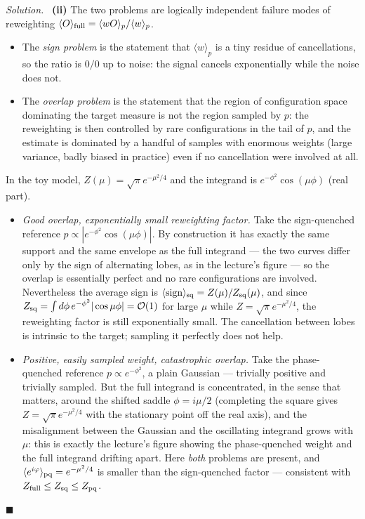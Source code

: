 \documentclass[11pt]{article}
\newenvironment{solution}{\par\smallskip\noindent\textit{Solution.}\ }{\hfill$\blacksquare$\par\smallskip}
\begin{document}
\begin{solution}
\textbf{(ii)} The two problems are logically independent failure modes of reweighting $\langle O\rangle_{\rm full} = \langle wO\rangle_p/\langle w\rangle_p$.
\begin{itemize}
  \item The \emph{sign problem} is the statement that $\langle w\rangle_p$ is a tiny residue of cancellations, so the ratio is $0/0$ up to noise: the signal cancels exponentially while the noise does not.
  \item The \emph{overlap problem} is the statement that the region of configuration space dominating the target measure is not the region sampled by $p$: the reweighting is then controlled by rare configurations in the tail of $p$, and the estimate is dominated by a handful of samples with enormous weights (large variance, badly biased in practice) even if no cancellation were involved at all.
\end{itemize}
In the toy model, $Z(\mu) = \sqrt\pi e^{-\mu^2/4}$ and the integrand is $e^{-\phi^2}\cos(\mu\phi)$ (real part).
\begin{itemize}
  \item[(a)] \emph{Good overlap, exponentially small reweighting factor.} Take the sign-quenched reference $p \propto |e^{-\phi^2}\cos(\mu\phi)|$. By construction it has exactly the same support and the same envelope as the full integrand --- the two curves differ only by the sign of alternating lobes, as in the lecture's figure --- so the overlap is essentially perfect and no rare configurations are involved. Nevertheless the average sign is $\langle \mathrm{sign}\rangle_{\rm sq} = Z(\mu)/Z_{\rm sq}(\mu)$, and since $Z_{\rm sq} = \int d\phi\, e^{-\phi^2}|\cos\mu\phi| = \mathcal{O}(1)$ for large $\mu$ while $Z = \sqrt\pi e^{-\mu^2/4}$, the reweighting factor is still exponentially small. The cancellation between lobes is intrinsic to the target; sampling it perfectly does not help.
  \item[(b)] \emph{Positive, easily sampled weight, catastrophic overlap.} Take the phase-quenched reference $p \propto e^{-\phi^2}$, a plain Gaussian --- trivially positive and trivially sampled. But the full integrand is concentrated, in the sense that matters, around the shifted saddle $\phi = i\mu/2$ (completing the square gives $Z = \sqrt\pi e^{-\mu^2/4}$ with the stationary point off the real axis), and the misalignment between the Gaussian and the oscillating integrand grows with $\mu$: this is exactly the lecture's figure showing the phase-quenched weight and the full integrand drifting apart. Here \emph{both} problems are present, and $\langle e^{i\varphi}\rangle_{\rm pq} = e^{-\mu^2/4}$ is smaller than the sign-quenched factor --- consistent with $Z_{\rm full}\le Z_{\rm sq}\le Z_{\rm pq}$.

\end{itemize}
\end{solution}
\end{document}
